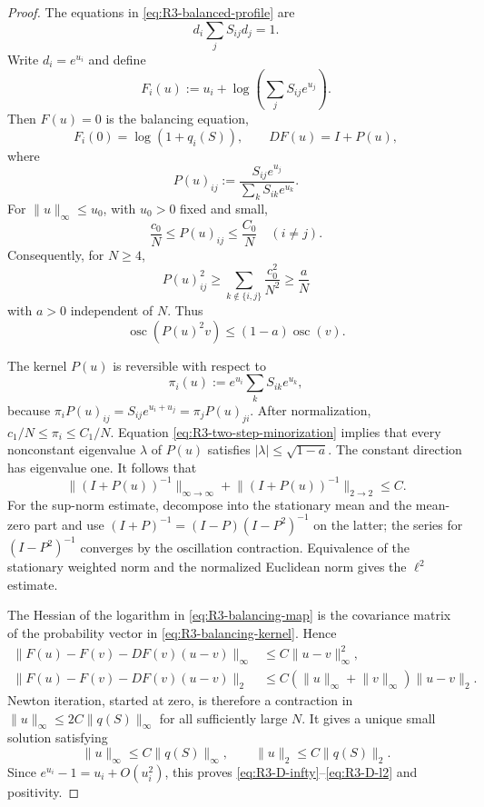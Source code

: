 \documentclass[10pt,a4paper]{amsart}
\newcommand{\norm}[1]{\lVert #1\rVert}
\begin{document}
\begin{proof}
The equations in \eqref{eq:R3-balanced-profile} are
\[
 d_i\sum_jS_{ij}d_j=1.
\]
Write \(d_i=e^{u_i}\) and define
\begin{equation}\label{eq:R3-balancing-map}
 F_i(u):=u_i+\log\left(\sum_jS_{ij}e^{u_j}\right).
\end{equation}
Then \(F(u)=0\) is the balancing equation,
\[
 F_i(0)=\log(1+q_i(S)),
 \qquad
 DF(u)=I+P(u),
\]
where
\begin{equation}\label{eq:R3-balancing-kernel}
 P(u)_{ij}:=
 \frac{S_{ij}e^{u_j}}{\sum_kS_{ik}e^{u_k}}.
\end{equation}
For \(\norm u_\infty\le u_0\), with \(u_0>0\) fixed and small,
\[
 \frac{c_0}{N}\le P(u)_{ij}\le\frac{C_0}{N}\quad(i\ne j).
\]
Consequently, for \(N\ge4\),
\begin{equation}\label{eq:R3-two-step-minorization}
 P(u)^2_{ij}
 \ge\sum_{k\notin\{i,j\}}\frac{c_0^2}{N^2}
 \ge\frac aN
\end{equation}
with \(a>0\) independent of \(N\).  Thus
\[
 \operatorname{osc}(P(u)^2v)
 \le(1-a)\operatorname{osc}(v).
\]

The kernel \(P(u)\) is reversible with respect to
\[
 \pi_i(u):=e^{u_i}\sum_kS_{ik}e^{u_k},
\]
because
\(\pi_iP(u)_{ij}=S_{ij}e^{u_i+u_j}=\pi_jP(u)_{ji}\).
After normalization, \(c_1/N\le\pi_i\le C_1/N\).
Equation \eqref{eq:R3-two-step-minorization} implies that every nonconstant
eigenvalue \(\lambda\) of \(P(u)\) satisfies
\(|\lambda|\le\sqrt{1-a}\).  The constant direction has eigenvalue one.
It follows that
\begin{equation}\label{eq:R3-balancing-inverse}
 \norm{(I+P(u))^{-1}}_{\infty\to\infty}
 +\norm{(I+P(u))^{-1}}_{2\to2}\le C.
\end{equation}
For the sup-norm estimate, decompose into the stationary mean and the
mean-zero part and use
\((I+P)^{-1}=(I-P)(I-P^2)^{-1}\) on the latter; the series for
\((I-P^2)^{-1}\) converges by the oscillation contraction.  Equivalence of
the stationary weighted norm and the normalized Euclidean norm gives the
\(\ell^2\) estimate.

The Hessian of the logarithm in \eqref{eq:R3-balancing-map} is the covariance
matrix of the probability vector in \eqref{eq:R3-balancing-kernel}.  Hence
\begin{align*}
 \norm{F(u)-F(v)-DF(v)(u-v)}_\infty
 &\le C\norm{u-v}_\infty^2,\\
 \norm{F(u)-F(v)-DF(v)(u-v)}_2
 &\le C(\norm u_\infty+\norm v_\infty)\norm{u-v}_2.
\end{align*}
Newton iteration, started at zero, is therefore a contraction in
\(\norm u_\infty\le2C\norm{q(S)}_\infty\) for all sufficiently large \(N\).
It gives a unique small solution satisfying
\[
 \norm u_\infty\le C\norm{q(S)}_\infty,
 \qquad
 \norm u_2\le C\norm{q(S)}_2.
\]
Since \(e^{u_i}-1=u_i+O(u_i^2)\), this proves
\eqref{eq:R3-D-infty}--\eqref{eq:R3-D-l2} and positivity.


\end{proof}
\end{document}
